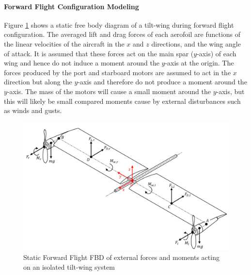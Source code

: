 \paragraph{Forward Flight Configuration Modeling}
Figure \ref{fig:FFFBD} shows a static free body diagram of a tilt-wing during forward flight configuration. The averaged lift and drag forces of each aerofoil are functions of the linear velocities of the aircraft in the $x$ and $z$ directions, and the wing angle of attack. It is assumed that these forces act on the main spar ($y$-axis) of each wing and hence do not induce a moment around the $y$-axis at the origin. The forces produced by the port and starboard motors are assumed to act in the $x$ direction but along the $y$-axis and therefore do not produce a moment around the $y$-axis. The mass of the motors will cause a small moment around the $y$-axis, but this will likely be small compared moments cause by external disturbances such as winds and gusts.\\
\begin{figure}[H]
    \centering
    \includegraphics[width = \textwidth]{Tiltwing/FFFBD.png}
    \caption{Static Forward Flight FBD of external forces and moments acting on an isolated tilt-wing system}
    \label{fig:FFFBD}
\end{figure}

